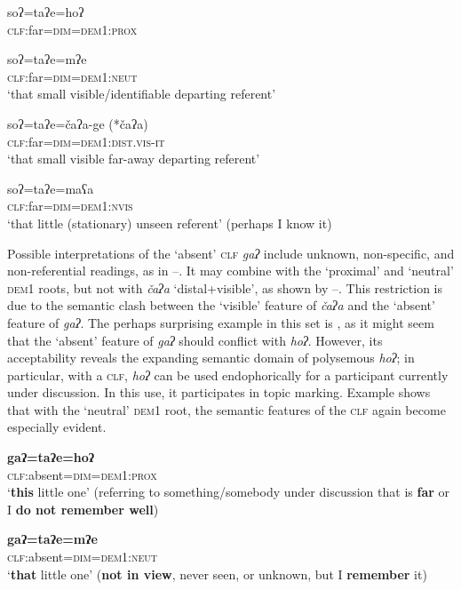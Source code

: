 \documentclass[output=paper,colorlinks,citecolor=brown]{langscibook}
\begin{document}
\ea\label{ex:payne:45}
\gll  *soʔ=taʔe=hoʔ\\
     \textsc{clf}:far=\textsc{dim=dem1:prox}\\
\glt {}
\z

\ea\label{ex:payne:46}
\gll  soʔ=taʔe=mʔe\\
     \textsc{clf}:far=\textsc{dim=dem1:neut}\\
\glt ‘that small visible/identifiable departing referent’
\z

\ea\label{ex:payne:47}
\gll  soʔ=taʔe=čaʔa-ge (*čaʔa)\\
 \textsc{clf}:far=\textsc{dim=dem1:dist.vis-it}\\
\glt ‘that small visible far-away departing referent’
\z

\ea\label{ex:payne:48}
\gll  soʔ=taʔe=maʕa\\
     \textsc{clf}:far=\textsc{dim=dem1:nvis}\\
\glt ‘that little (stationary) unseen referent’ (perhaps I know it)
\z

Possible interpretations of the ‘absent’ \textsc{clf} \textit{gaʔ} include unknown, non-specific, and non-referential readings, as in –. It may combine with the ‘proximal’ and ‘neutral’ \textsc{dem1} roots, but not with \textit{čaʔa} ‘distal+visible’, as shown by –. This restriction is due to the semantic clash between the ‘visible’ feature of \textit{čaʔa} and the ‘absent’ feature of \textit{gaʔ}. The perhaps surprising example in this set is , as it might seem that the ‘absent’ feature of \textit{gaʔ} should conflict with \textit{hoʔ}. However, its acceptability reveals the expanding semantic domain of polysemous \textit{hoʔ}; in particular, with a \textsc{clf,} \textit{hoʔ} can be used endophorically for a participant currently under discussion. In this use, it participates in topic marking. Example  shows that with the ‘neutral’ \textsc{dem1} root, the semantic features of the \textsc{clf} again become especially evident.

\ea\label{ex:payne:49}
\gll  \textbf{gaʔ=taʔe=hoʔ}\\
 \textsc{clf}:absent\textsc{=dim=dem1:prox}\\
\glt ‘\textbf{this} little one’ (referring to something/somebody under discussion that is \textbf{far} or I \textbf{do not remember well})
\z

\ea\label{ex:payne:50}
\gll  \textbf{gaʔ=taʔe=mʔe}\\
 \textsc{clf}:absent\textsc{=dim=dem1:neut}\\
\glt ‘\textbf{that} little one’ (\textbf{not in view}, never seen, or unknown, but I \textbf{remember} it)
\z
\end{document}
